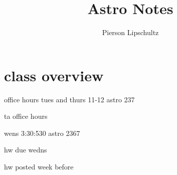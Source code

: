\documentclass{article}
\title{Astro Notes}
\author{Pierson Lipschultz}
\begin{document}
\maketitle

\section{class overview}
office hours tues and thurs 11-12 astro 237

ta office hours

wens 3:30:530 astro 2367

hw due wedns

hw posted week before
\end{document}
